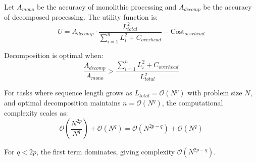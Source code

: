 \begin{theorem}
Let $A_{mono}$ be the accuracy of monolithic processing and $A_{decomp}$ be the accuracy of decomposed processing. The utility function is:
\begin{equation}
U = A_{decomp} \cdot \frac{L_{total}^2}{\sum_{i=1}^{n} L_i^2 + C_{overhead}} - \text{Cost}_{overhead}
\end{equation}

Decomposition is optimal when:
\begin{equation}
\frac{A_{decomp}}{A_{mono}} > \frac{\sum_{i=1}^{n} L_i^2 + C_{overhead}}{L_{total}^2}
\end{equation}
\end{theorem}

\begin{theorem}
For tasks where sequence length grows as $L_{total} = \mathcal{O}(N^p)$ with problem size $N$, and optimal decomposition maintains $n = \mathcal{O}(N^q)$, the computational complexity scales as:
\begin{equation}
\mathcal{O}\left(\frac{N^{2p}}{N^q}\right) + \mathcal{O}(N^q) = \mathcal{O}(N^{2p-q}) + \mathcal{O}(N^q)
\end{equation}

For $q < 2p$, the first term dominates, giving complexity $\mathcal{O}(N^{2p-q})$.
\end{theorem}